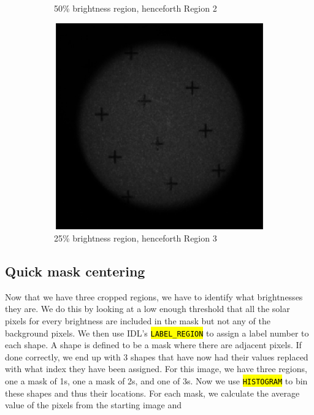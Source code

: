 \documentclass[10pt]{scrartcl}
\begin{document}
\begin{figure}[!ht]
\begin{subfigure}[b]{.3\linewidth}
        \caption{50\% brightness region, henceforth Region 2}
    \end{subfigure}
    \begin{subfigure}[b]{.3\linewidth}
        \centering
        \includegraphics[width=1.3\textwidth]{../plots_tables_images/tritest_reg3}
        \caption{25\% brightness region, henceforth Region 3}
    \end{subfigure}
    \caption{}
    \label{triplecrop}
\end{figure}

\subsection{Quick mask centering} %
\label{sub:quick_mask_centering}

	Now that we have three cropped regions, we have to identify what brightnesses they are. We do this by looking at a low enough threshold that all the solar pixels for every brightness are included in the mask but not any of the background pixels. We then use IDL's \hl{\texttt{LABEL\_REGION}} to assign a label number to each shape. A shape is defined to be a mask where there are adjacent pixels. If done correctly, we end up with 3 shapes that have now had their values replaced with what index they have been assigned. For this image, we have three regions, one a mask of 1s, one a mask of 2s, and one of 3s. Now we use \hl{\texttt{HISTOGRAM}} to bin these shapes and thus their locations. For each mask, we calculate the average value of the pixels from the starting image and  
\end{document}
